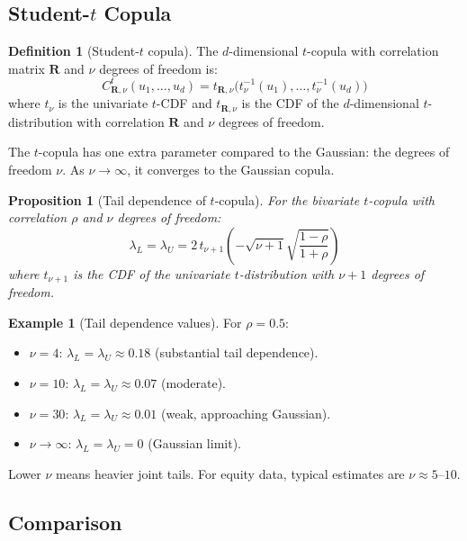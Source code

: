 \documentclass[11pt, a4paper]{article}
\theoremstyle{definition}
\newtheorem{definition}{Definition}[section]
\newtheorem{example}{Example}[section]
\theoremstyle{plain}
\newtheorem{proposition}{Proposition}[section]
\theoremstyle{remark}
\begin{document}
\subsection{Student-$t$ Copula}

\begin{definition}[Student-$t$ copula]
The $d$-dimensional $t$-copula with correlation matrix $\bm{R}$ and $\nu$ degrees of freedom is:
\[
    C_{\bm{R}, \nu}^{t}(u_1, \ldots, u_d)
    = t_{\bm{R}, \nu}\bigl(t_\nu^{-1}(u_1), \ldots, t_\nu^{-1}(u_d)\bigr)
\]
where $t_\nu$ is the univariate $t$-CDF and $t_{\bm{R}, \nu}$ is the CDF of the
$d$-dimensional $t$-distribution with correlation $\bm{R}$ and $\nu$ degrees of freedom.
\end{definition}

The $t$-copula has one extra parameter compared to the Gaussian: the degrees of freedom $\nu$.
As $\nu \to \infty$, it converges to the Gaussian copula.

\begin{proposition}[Tail dependence of $t$-copula]
For the bivariate $t$-copula with correlation $\rho$ and $\nu$ degrees of freedom:
\[
    \lambda_L = \lambda_U = 2 \, t_{\nu+1}\!\left(-\sqrt{\nu + 1}\sqrt{\frac{1-\rho}{1+\rho}}\right)
\]
where $t_{\nu+1}$ is the CDF of the univariate $t$-distribution with $\nu + 1$ degrees of freedom.
\end{proposition}

\begin{example}[Tail dependence values]
For $\rho = 0.5$:
\begin{itemize}
    \item $\nu = 4$: $\lambda_L = \lambda_U \approx 0.18$ (substantial tail dependence).
    \item $\nu = 10$: $\lambda_L = \lambda_U \approx 0.07$ (moderate).
    \item $\nu = 30$: $\lambda_L = \lambda_U \approx 0.01$ (weak, approaching Gaussian).
    \item $\nu \to \infty$: $\lambda_L = \lambda_U = 0$ (Gaussian limit).
\end{itemize}
Lower $\nu$ means heavier joint tails.
For equity data, typical estimates are $\nu \approx 5$--$10$.
\end{example}

\subsection{Comparison}
\end{document}
